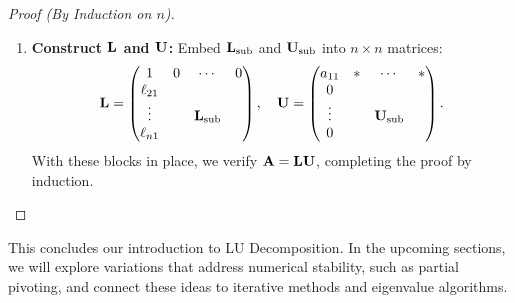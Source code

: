\documentclass[../../cs111_main.tex]{subfiles}
\begin{document}
\begin{proof}[Proof (By Induction on $n$)]
\begin{enumerate}
    \item \textbf{Construct $\mathbf{L}$ and $\mathbf{U}$:} Embed $\mathbf{L}_{\text{sub}}$ and $\mathbf{U}_{\text{sub}}$ into $n\times n$ matrices:
    \[
    \mathbf{L} = \begin{pmatrix}
    1 & 0 & \cdots & 0 \\
    \ell_{21} & & & \\
    \vdots & & \mathbf{L}_{\text{sub}} & \\
    \ell_{n1} & & &
    \end{pmatrix},
    \quad
    \mathbf{U} = \begin{pmatrix}
    a_{11} & * & \cdots & * \\
    0 & & & \\
    \vdots & & \mathbf{U}_{\text{sub}} & \\
    0 & & &
    \end{pmatrix}.
    \]
    With these blocks in place, we verify $\mathbf{A} = \mathbf{L} \mathbf{U}$, completing the proof by induction.
\end{enumerate}
\end{proof}



\noindent This concludes our introduction to LU Decomposition. In the upcoming sections, we will explore variations that address numerical stability, such as partial pivoting, and connect these ideas to iterative methods and eigenvalue algorithms.
\end{document}

